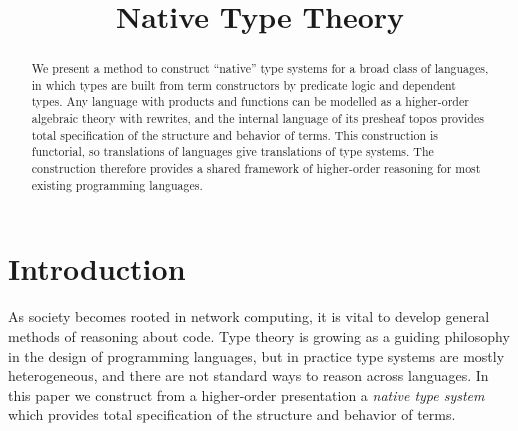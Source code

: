 \documentclass[conference]{IEEEtran}
\theoremstyle{definition}
\begin{document}
\title{Native Type Theory}


\author{
\and
{}
}

\maketitle

\begin{abstract}
    We present a method to construct ``native'' type systems for a broad class of languages, in which types are built from term constructors by predicate logic and dependent types. Any language with products and functions can be modelled as a higher-order algebraic theory with rewrites, and the internal language of its presheaf topos provides total specification of the structure and behavior of terms. This construction is functorial, so translations of languages give translations of type systems.  The construction therefore provides a shared framework of higher-order reasoning for most existing programming languages.
\end{abstract}

\section{Introduction}
\label{sec:intro}


As society becomes rooted in network computing, it is vital to develop general methods of reasoning about code. Type theory is growing as a guiding philosophy in the design of programming languages, but in practice type systems are mostly heterogeneous, and there are not standard ways to reason across languages. In this paper we construct from a higher-order presentation a \textit{native type system} which provides total specification of the structure and behavior of terms.
\end{document}
